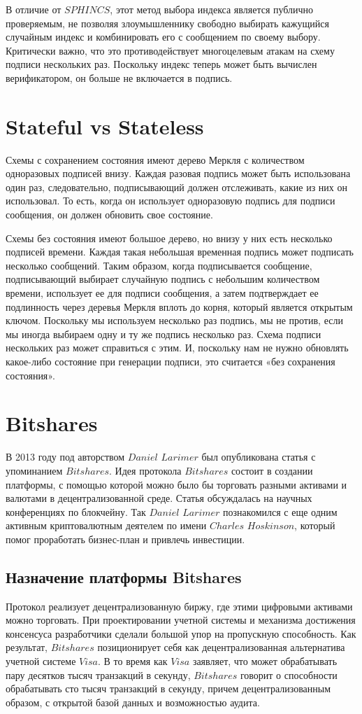 \documentclass[a4paper, 14pt]{extarticle}
\begin{document}
В отличие от $SPHINCS$, этот метод выбора индекса является публично проверяемым, не позволяя злоумышленнику свободно выбирать кажущийся случайным индекс и комбинировать его с сообщением по своему выбору. Критически важно, что это противодействует многоцелевым атакам на схему подписи нескольких раз. Поскольку индекс теперь может быть вычислен верификатором, он больше не включается в подпись.
\newpage

\section{Stateful vs Stateless}
Схемы с сохранением состояния имеют дерево Меркля с количеством одноразовых подписей внизу. Каждая разовая подпись может быть использована один раз, следовательно, подписывающий должен отслеживать, какие из них он использовал. То есть, когда он использует одноразовую подпись для подписи сообщения, он должен обновить свое состояние.

Схемы без состояния имеют большое дерево, но внизу у них есть несколько подписей времени. Каждая такая небольшая временная подпись может подписать несколько сообщений. Таким образом, когда подписывается сообщение, подписывающий выбирает случайную подпись с небольшим количеством времени, использует ее для подписи сообщения, а затем подтверждает ее подлинность через деревья Меркля вплоть до корня, который является открытым ключом. Поскольку мы используем несколько раз подпись, мы не против, если мы иногда выбираем одну и ту же подпись несколько раз. Схема подписи нескольких раз может справиться с этим. И, поскольку нам не нужно обновлять какое-либо состояние при генерации подписи, это считается «без сохранения состояния».
\newpage

\section{Bitshares}
В 2013 году под авторством $Daniel$ $Larimer$ был опубликована статья с упоминанием $Bitshares$. Идея протокола $Bitshares$ состоит в создании платформы, с помощью которой можно было бы торговать разными активами и валютами в децентрализованной среде. Статья обсуждалась на научных конференциях по блокчейну. Так $Daniel$ $Larimer$ познакомился с еще одним активным криптовалютным деятелем по имени $Charles$ $Hoskinson$, который помог проработать бизнес-план и привлечь инвестиции.

\subsection{Назначение платформы Bitshares}
Протокол реализует децентрализованную биржу, где этими цифровыми активами можно торговать. При проектировании учетной системы и механизма достижения консенсуса разработчики сделали большой упор на пропускную способность. Как результат, $Bitshares$ позиционирует себя как децентрализованная альтернатива учетной системе $Visa$. В то время как $Visa$ заявляет, что может обрабатывать пару десятков тысяч транзакций в секунду, $Bitshares$ говорит о способности обрабатывать сто тысяч транзакций в секунду, причем децентрализованным образом, с открытой базой данных и возможностью аудита.
\end{document}
